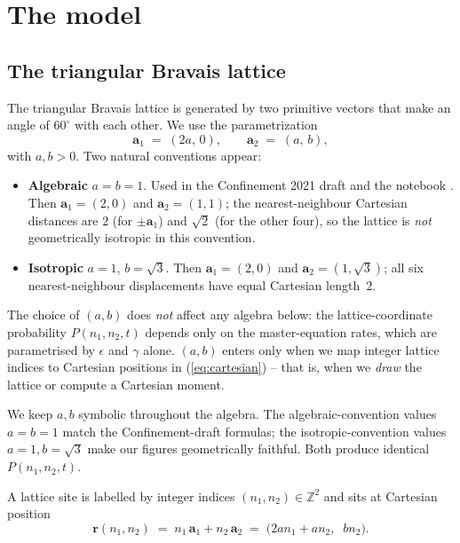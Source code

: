 \documentclass[11pt,a4paper]{article}
\newcommand{\vr}{\mathbf{r}}
\newcommand{\va}[1]{\mathbf{a}_{#1}}
\begin{document}
\section{The model}\label{sec:model}

\subsection{The triangular Bravais lattice}\label{ssec:lattice}

The triangular Bravais lattice is generated by two primitive vectors
that make an angle of $60^\circ$ with each other. We use the
parametrization
\begin{equation}\label{eq:basis}
\va{1} \;=\; (2a, \, 0), \qquad \va{2} \;=\; (a, \, b),
\end{equation}
with $a, b > 0$. Two natural conventions appear:
\begin{itemize}[leftmargin=*]
\item \textbf{Algebraic} $a = b = 1$. Used in the Confinement 2021 draft
  and the notebook {}. Then $\va{1} = (2, 0)$ and
  $\va{2} = (1, 1)$; the nearest-neighbour Cartesian distances are $2$
  (for $\pm \va{1}$) and $\sqrt{2}$ (for the other four), so the lattice
  is \emph{not} geometrically isotropic in this convention.
\item \textbf{Isotropic} $a = 1$, $b = \sqrt{3}$. Then $\va{1} = (2, 0)$
  and $\va{2} = (1, \sqrt{3})$; all six nearest-neighbour displacements
  have equal Cartesian length~$2$.
\end{itemize}
\begin{keyresult}
The choice of $(a, b)$ does \emph{not} affect any algebra below: the
lattice-coordinate probability $P(n_1, n_2, t)$ depends only on the
master-equation rates, which are parametrised by $\epsilon$ and $\gamma$
alone. $(a, b)$ enters only when we map integer lattice indices to
Cartesian positions in (\ref{eq:cartesian}) -- that is, when we
\emph{draw} the lattice or compute a Cartesian moment.
\end{keyresult}
\noindent We keep $a, b$ symbolic throughout the algebra. The
algebraic-convention values $a = b = 1$ match the Confinement-draft
formulas; the isotropic-convention values $a = 1, b = \sqrt{3}$ make our
figures geometrically faithful. Both produce identical $P(n_1, n_2, t)$.

A lattice site is labelled by integer indices $(n_1, n_2) \in \mathbb{Z}^2$
and sits at Cartesian position
\begin{equation}\label{eq:cartesian}
\vr(n_1, n_2) \;=\; n_1\, \va{1} + n_2 \, \va{2}
\;=\; \big(2 a n_1 + a n_2, \;\; b n_2\big).
\end{equation}
\end{document}
